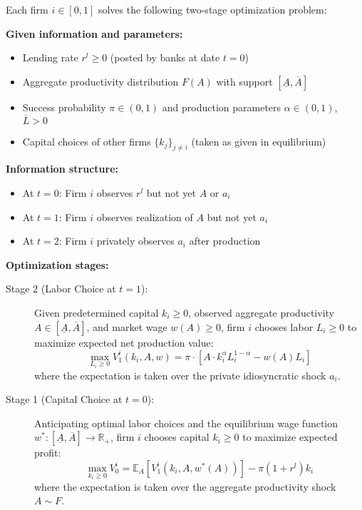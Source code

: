 \documentclass[12pt]{article}
\begin{document}
\begin{definition}\label{def:firm-problem}
Each firm $i \in [0,1]$ solves the following two-stage optimization problem:

\textbf{Given information and parameters:}
\begin{itemize}
    \item Lending rate $r^l \geq 0$ (posted by banks at date $t=0$)
    \item Aggregate productivity distribution $F(A)$ with support $[\underline{A}, \overline{A}]$
    \item Success probability $\pi \in (0,1)$ and production parameters $\alpha \in (0,1)$, $\overline{L} > 0$
    \item Capital choices of other firms $\{k_j\}_{j \neq i}$ (taken as given in equilibrium)
\end{itemize}

\textbf{Information structure:}
\begin{itemize}
    \item At $t=0$: Firm $i$ observes $r^l$ but not yet $A$ or $a_i$
    \item At $t=1$: Firm $i$ observes realization of $A$ but not yet $a_i$
    \item At $t=2$: Firm $i$ privately observes $a_i$ after production
\end{itemize}

\textbf{Optimization stages:}
\begin{description}
    \item[Stage 2 (Labor Choice at $t=1$):] Given predetermined capital $k_{i} \geq 0$, observed aggregate productivity $A \in [\underline{A}, \overline{A}]$, and market wage $w(A) \geq 0$, firm $i$ chooses labor $L_i \geq 0$ to maximize expected net production value:
    \begin{equation}
        \max_{L_{i} \ge 0} V_{1}^{i}(k_{i},A,w) = \pi \cdot [A \cdot k_{i}^{\alpha}L_{i}^{1-\alpha} - w(A)L_{i}]
    \end{equation}
    where the expectation is taken over the private idiosyncratic shock $a_i$.
    
    \item[Stage 1 (Capital Choice at $t=0$):] Anticipating optimal labor choices and the equilibrium wage function $w^{*}: [\underline{A}, \overline{A}] \to \mathbb{R}_+$, firm $i$ chooses capital $k_i \geq 0$ to maximize expected profit:
    \begin{equation}
        \max_{k_i \geq 0} V_{0}^{i} = \mathbb{E}_{A}[V_{1}^{i}(k_{i},A,w^{*}(A))] - \pi(1+r^{l})k_{i}
    \end{equation}
    where the expectation is taken over the aggregate productivity shock $A \sim F$.
\end{description}


\end{definition}
\end{document}
